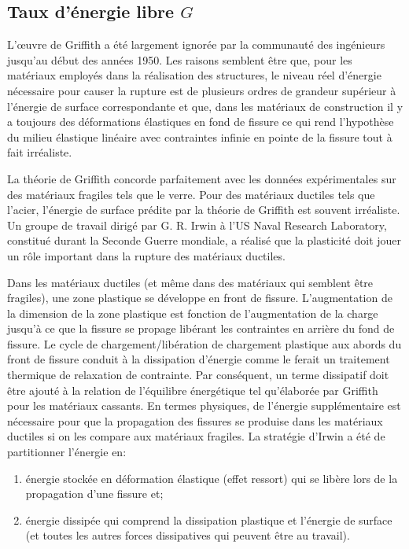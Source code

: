 \medskip
\subsection{Taux d'énergie libre $G$}

\medskip
\begin{histoire}%
L'œuvre de Griffith a été largement ignorée par
la communauté des ingénieurs jusqu'au début des années 1950.
Les raisons semblent être que, pour les matériaux employés dans la réalisation des structures,
le niveau réel d'énergie nécessaire pour causer la rupture est de plusieurs ordres de grandeur
supérieur à l'énergie de surface correspondante et que, dans les matériaux de construction il
y a toujours des déformations élastiques en fond de fissure ce qui rend l'hypothèse du milieu
élastique linéaire avec contraintes infinie en pointe de la fissure tout à fait irréaliste.

\medskip
La théorie de Griffith concorde parfaitement avec
les données expérimentales sur des matériaux fragiles tels que le verre. Pour des matériaux ductiles
tels que l'acier, l'énergie de surface prédite par la théorie de Griffith
est souvent irréaliste.
Un groupe de travail dirigé par G. R. Irwin à
l'US Naval Research Laboratory, constitué durant la  Seconde Guerre mondiale, a réalisé que la plasticité
doit jouer un rôle important dans la rupture  des matériaux ductiles.

\medskip
Dans les matériaux ductiles (et même dans des matériaux qui semblent être fragiles), une zone
plastique se développe en front de fissure.
L'augmentation de la dimension de la zone plastique est fonction de l'augmentation de la charge jusqu'à
ce que la fissure se propage libérant les contraintes en arrière du fond de fissure.
Le cycle de chargement/libération de chargement plastique aux abords du front de fissure conduit à
la dissipation d'énergie comme le ferait un traitement thermique de relaxation de contrainte.
Par conséquent, un terme dissipatif doit être ajouté à la relation de l'équilibre énergétique tel
qu'élaborée par Griffith pour les matériaux cassants.
En termes physiques, de l'énergie supplémentaire est nécessaire pour que la propagation des fissures
se produise dans les matériaux ductiles si on les compare aux matériaux fragiles.
\medskipvm
La stratégie d'Irwin a été de partitionner
l'énergie en:
\begin{enumerate}
\item énergie stockée en déformation élastique (effet ressort) qui se libère lors de la propagation
d'une fissure et;
\item énergie dissipée qui comprend la dissipation plastique et l'énergie de surface (et toutes les autres
forces dissipatives qui peuvent être au travail).
\end{enumerate}
\end{histoire}

